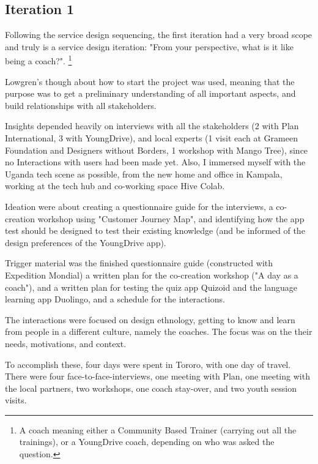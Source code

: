 \subsection{Iteration 1}


Following the service design sequencing, the first iteration had a very broad scope and truly is a service design iteration: "From your perspective, what is it like being a coach?". \footnote{A coach meaning either a Community Based Trainer (carrying out all the trainings), or a YoungDrive coach, depending on who was asked the question.}

Lowgren's though about how to start the project was used, meaning that the purpose was to get a preliminary understanding of all important aspects, and build relationships with all stakeholders.


Insights depended heavily on interviews with all the stakeholders  (2 with Plan International, 3 with YoungDrive), and local experts (1 visit each at Grameen Foundation and Designers without Borders, 1 workshop with Mango Tree), since no Interactions with users had been made yet. Also, I immersed myself with the Uganda tech scene as possible, from the new home and office in Kampala, working at the tech hub and co-working space Hive Colab.

Ideation were about creating a questionnaire guide for the interviews, a co-creation workshop using "Customer Journey Map", and identifying how the app test should be designed to test their existing knowledge (and be informed of the design preferences of the YoungDrive app).

Trigger material was the finished questionnaire guide (constructed with Expedition Mondial) a written plan for the co-creation workshop ("A day as a coach"), and a written plan for testing the quiz app Quizoid and the language learning app Duolingo, and a schedule for the interactions.

The interactions were focused on design ethnology, getting to know and learn from people in a different culture, namely the coaches. The focus was on the their needs, motivations, and context.

To accomplish these, four days were spent in Tororo, with one day of travel. There were four face-to-face-interviews,
one meeting with Plan, one meeting with the local partners, two workshops, one coach stay-over, and two youth session visits.
